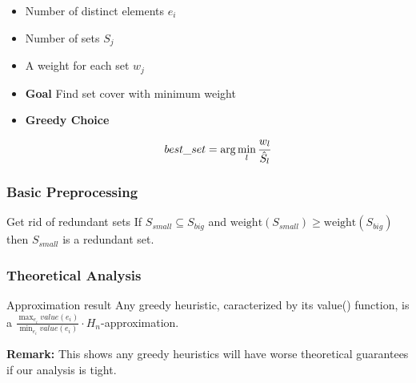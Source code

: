 \documentclass{beamer}
\newlength\myheight
\newlength\mydepth
\newcommand*\inlinegraphics[1]{%
  \settototalheight\myheight{Xygp}%
  \settodepth\mydepth{Xygp}%
  \raisebox{-\mydepth}{\texttt{[image: \#1]}}%
}
\begin{document}
\begin{frame}
\begin{minipage}{0.45\textwidth}
\begin{overlayarea}{\textwidth}{0.5\textheight}
%
\end{overlayarea}%
\end{minipage}%
\begin{minipage}{0.55\textwidth} 
\begin{itemize}
\item<1-> Number of distinct elements $e_i$
\item<2-> Number of sets $S_j$
\item<3-> A weight for each set $w_j$
\item<4-> \textbf{Goal} Find set cover with minimum weight
\item<5> \textbf{Greedy Choice} $$best\_set = \arg \min_{l} \cfrac{w_l}{\hat{S}_l}$$
\end{itemize}
\end{minipage}
\end{frame}

\begin{frame}
\frametitle{Basic Preprocessing}
\begin{block}{Get rid of redundant sets \inlinegraphics{sweep.eps}}
If $S_{small} \subseteq S_{big}$ and $\text{weight}(S_{small})\geq \text{weight}(S_{big})$ then $S_{small}$ is a redundant set.
\end{block}
\end{frame}

\begin{frame}
\frametitle{Theoretical Analysis}
\begin{block}{Approximation result}
Any greedy heuristic, caracterized by its value() function, is a $\displaystyle\frac{\displaystyle\max_{e_i} value(e_i)}{\displaystyle\min_{e_i} value(e_i)} \cdot H_n$-approximation.
\end{block}

\textbf{Remark:} This shows any greedy heuristics will have worse theoretical guarantees if our analysis is tight.
\end{frame}
\end{document}
